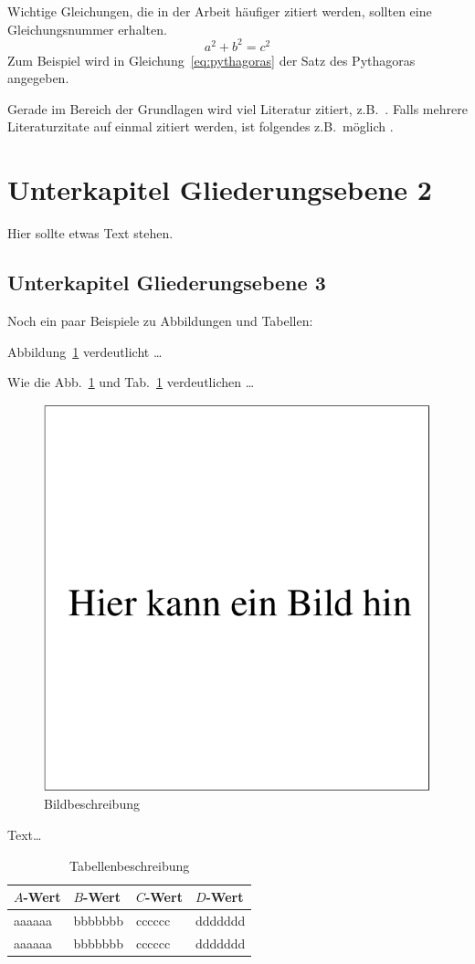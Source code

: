 \documentclass[bachelor,       %
               twoside,        %
               BCOR10mm,       %
               ngerman,english  %
               ]{GAUBM}
\begin{document}
Wichtige Gleichungen, die in der Arbeit h{\"a}ufiger zitiert werden,
sollten eine Gleichungsnummer erhalten.
\begin{equation}
  \label{eq:pythagoras}
  a^2+b^2=c^2
\end{equation}
Zum Beispiel wird in Gleichung~\ref{eq:pythagoras} der Satz des Pythagoras
angegeben.

Gerade im Bereich der Grundlagen wird viel Literatur zitiert, z.B.\
\cite{Menz97}. Falls
mehrere Literaturzitate auf einmal zitiert werden, ist folgendes
z.B.\ m{\"o}glich \cite{Horn90,DINEN6232,Menz97,Knuth84}.

\section{Unterkapitel Gliederungsebene 2}
Hier sollte etwas Text stehen.
\subsection{Unterkapitel Gliederungsebene 3}
Noch ein paar Beispiele zu Abbildungen und Tabellen:

Abbildung~\ref{fig:bildplatzhalter} verdeutlicht \dots

Wie die Abb.~\ref{fig:bildplatzhalter} und
Tab.~\ref{tab:tabellenplatzhalter} verdeutlichen \dots

\begin{figure}
  \centering
  \includegraphics[width=0.5\linewidth]{figures/bild}
  \caption{Bildbeschreibung}
  \label{fig:bildplatzhalter}
\end{figure}

Text\dots
\begin{table}[ht]
  \centering
  \begin{tabular}{llll}
    \toprule
    $A$-Wert&$B$-Wert&$C$-Wert&$D$-Wert\\
    \midrule
    aaaaaa&bbbbbbb&cccccc&ddddddd\\
    aaaaaa&bbbbbbb&cccccc&ddddddd\\
    \bottomrule
  \end{tabular}
  \caption{Tabellenbeschreibung}
  \label{tab:tabellenplatzhalter}
\end{table}
\end{document}
